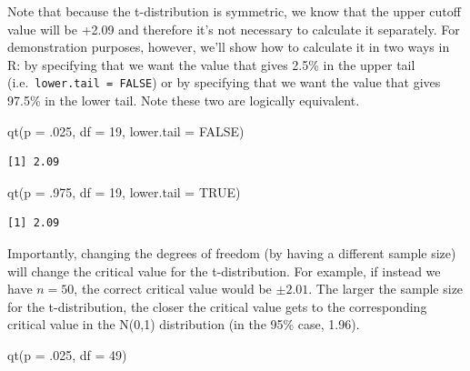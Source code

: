 \documentclass[
  letterpaper,
  DIV=11,
  numbers=noendperiod]{scrreprt}
\newenvironment{Shaded}{\begin{snugshade}}{\end{snugshade}}
\newcommand{\AttributeTok}[1]{\textcolor[rgb]{0.40,0.45,0.13}{#1}}
\newcommand{\ConstantTok}[1]{\textcolor[rgb]{0.56,0.35,0.01}{#1}}
\newcommand{\DecValTok}[1]{\textcolor[rgb]{0.68,0.00,0.00}{#1}}
\newcommand{\FunctionTok}[1]{\textcolor[rgb]{0.28,0.35,0.67}{#1}}
\newcommand{\NormalTok}[1]{\textcolor[rgb]{0.00,0.23,0.31}{#1}}
\theoremstyle{definition}
\theoremstyle{remark}
\begin{document}
Note that because the t-distribution is symmetric, we know that the
upper cutoff value will be +2.09 and therefore it's not necessary to
calculate it separately. For demonstration purposes, however, we'll show
how to calculate it in two ways in R: by specifying that we want the
value that gives 2.5\% in the upper tail
(i.e.~\texttt{lower.tail\ =\ FALSE}) or by specifying that we want the
value that gives 97.5\% in the lower tail. Note these two are logically
equivalent.

\begin{Shaded}
\begin{Highlighting}[]
\FunctionTok{qt}\NormalTok{(}\AttributeTok{p =}\NormalTok{ .}\DecValTok{025}\NormalTok{, }\AttributeTok{df =} \DecValTok{19}\NormalTok{, }\AttributeTok{lower.tail =} \ConstantTok{FALSE}\NormalTok{)}
\end{Highlighting}
\end{Shaded}

\begin{verbatim}
[1] 2.09
\end{verbatim}

\begin{Shaded}
\begin{Highlighting}[]
\FunctionTok{qt}\NormalTok{(}\AttributeTok{p =}\NormalTok{ .}\DecValTok{975}\NormalTok{, }\AttributeTok{df =} \DecValTok{19}\NormalTok{, }\AttributeTok{lower.tail =} \ConstantTok{TRUE}\NormalTok{)}
\end{Highlighting}
\end{Shaded}

\begin{verbatim}
[1] 2.09
\end{verbatim}

Importantly, changing the degrees of freedom (by having a different
sample size) will change the critical value for the t-distribution. For
example, if instead we have \(n = 50\), the correct critical value would
be \(\pm 2.01\). The larger the sample size for the t-distribution, the
closer the critical value gets to the corresponding critical value in
the N(0,1) distribution (in the 95\% case, 1.96).

\begin{Shaded}
\begin{Highlighting}[]
\FunctionTok{qt}\NormalTok{(}\AttributeTok{p =}\NormalTok{ .}\DecValTok{025}\NormalTok{, }\AttributeTok{df =} \DecValTok{49}\NormalTok{)}
\end{Highlighting}
\end{Shaded}
\end{document}
